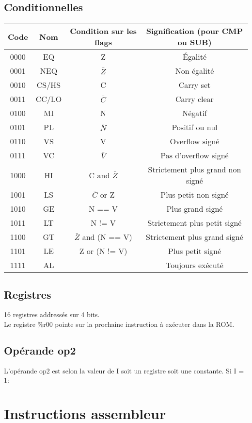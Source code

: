 \documentclass[a4paper]{article}
\begin{document}
  \subsection{Conditionnelles}
\begin{tabular}{|c|c|c|c|}
  \hline
  Code & Nom & Condition sur les flags & Signification (pour CMP ou SUB)\\
  \hline
  0000 & EQ & Z & Égalité\\
  0001 & NEQ & $\bar{Z}$ & Non égalité\\
  0010 & CS/HS & C & Carry set\\
  0011 & CC/LO & $\bar{C}$ & Carry clear\\
  0100 & MI & N & Négatif \\
  0101 & PL & $\bar{N}$ & Positif ou nul \\
  0110 & VS & V & Overflow signé \\
  0111 & VC & $\bar{V}$ & Pas d'overflow signé \\
  1000 & HI & C and $\bar{Z}$ & Strictement plus grand non signé \\
  1001 & LS & $\bar{C}$ or Z & Plus petit non signé \\
  1010 & GE & N == V & Plus grand signé \\
  1011 & LT & N != V & Strictement plus petit signé\\
  1100 & GT & $\bar{Z}$ and (N == V) & Strictement plus grand signé \\
  1101 & LE & Z or (N != V) & Plus petit signé \\
  1111 & AL &  & Toujours exécuté \\
  \hline
\end{tabular}

\subsection{Registres}
16 registres addressés sur 4 bits.\\
Le registre \%r00 pointe sur la prochaine instruction à exécuter dans la ROM.
\subsection{Opérande op2}
L'opérande op2 est selon la valeur de I soit un registre soit une constante.
Si I = 1:

\section{Instructions assembleur}
\end{document}
